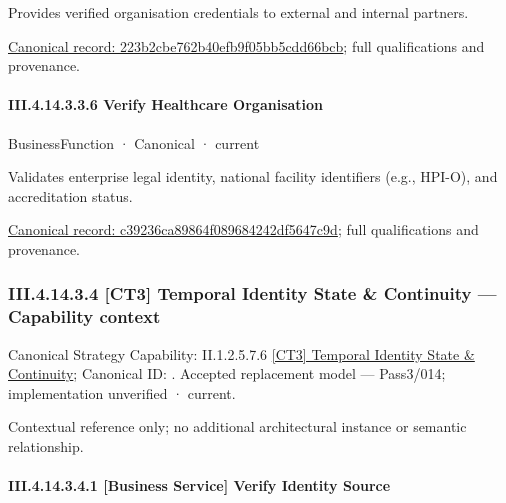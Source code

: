 Provides verified organisation credentials to external and internal partners.


{\footnotesize \href{../../../../../../../../continuum/business/business-service/223b2cbe762b40efb9f05bb5cdd66bcb.md}{Canonical record: 223b2cbe762b40efb9f05bb5cdd66bcb}; full qualifications and provenance.}\par
\paragraph*{III.4.14.3.3.6 Verify Healthcare Organisation}
\label{navigation:III.4.14.3.3.6}

\label{element:c39236ca89864f089684242df5647c9d}
{\small BusinessFunction · Canonical · current}\par

Validates enterprise legal identity, national facility identifiers (e.g., HPI-O), and accreditation status.


{\footnotesize \href{../../../../../../../../continuum/business/business-function/c39236ca89864f089684242df5647c9d.md}{Canonical record: c39236ca89864f089684242df5647c9d}; full qualifications and provenance.}\par
\subsubsection*{III.4.14.3.4 [CT3] Temporal Identity State \& Continuity — Capability context}
\label{navigation:III.4.14.3.4}

{\small Canonical Strategy Capability: II.1.2.5.7.6 \hyperref[element:dae537d7b2f94d1596036ba891cab10d]{[CT3] Temporal Identity State \& Continuity}; Canonical ID: \texttt{}. Accepted replacement model — Pass3/014; implementation unverified · current.}\par
Contextual reference only; no additional architectural instance or semantic relationship.\par
\paragraph*{III.4.14.3.4.1 [Business Service] Verify Identity Source}
\label{navigation:III.4.14.3.4.1}

